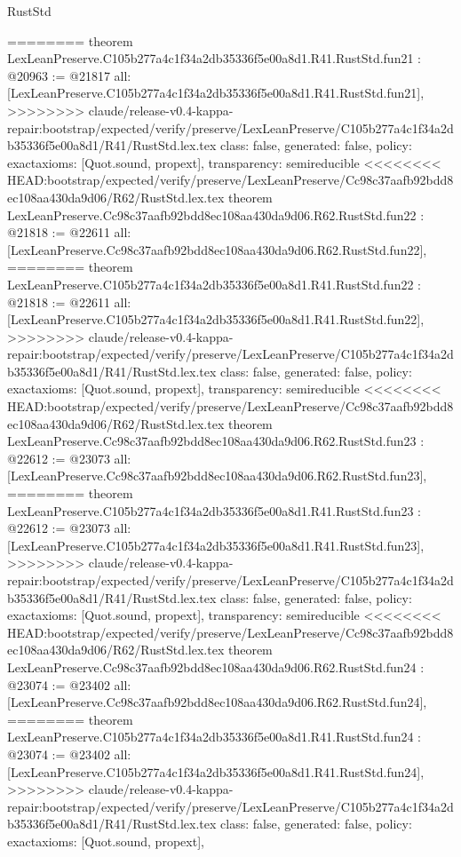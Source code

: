 \begin{lexlean}{RustStd}
\begin{coremodule}
{\begin{coremodule}
{{{{{{{{{{{{{{{{{{{{{{{{========
theorem LexLeanPreserve.C105b277a4c1f34a2db35336f5e00a8d1.R41.RustStd.fun21 : @20963 := @21817 {
  all: [LexLeanPreserve.C105b277a4c1f34a2db35336f5e00a8d1.R41.RustStd.fun21],
>>>>>>>> claude/release-v0.4-kappa-repair:bootstrap/expected/verify/preserve/LexLeanPreserve/C105b277a4c1f34a2db35336f5e00a8d1/R41/RustStd.lex.tex
  class: false,
  generated: false,
  policy: exact{axioms: [Quot.sound, propext]},
  transparency: semireducible
}
<<<<<<<< HEAD:bootstrap/expected/verify/preserve/LexLeanPreserve/Cc98c37aafb92bdd8ec108aa430da9d06/R62/RustStd.lex.tex
theorem LexLeanPreserve.Cc98c37aafb92bdd8ec108aa430da9d06.R62.RustStd.fun22 : @21818 := @22611 {
  all: [LexLeanPreserve.Cc98c37aafb92bdd8ec108aa430da9d06.R62.RustStd.fun22],
========
theorem LexLeanPreserve.C105b277a4c1f34a2db35336f5e00a8d1.R41.RustStd.fun22 : @21818 := @22611 {
  all: [LexLeanPreserve.C105b277a4c1f34a2db35336f5e00a8d1.R41.RustStd.fun22],
>>>>>>>> claude/release-v0.4-kappa-repair:bootstrap/expected/verify/preserve/LexLeanPreserve/C105b277a4c1f34a2db35336f5e00a8d1/R41/RustStd.lex.tex
  class: false,
  generated: false,
  policy: exact{axioms: [Quot.sound, propext]},
  transparency: semireducible
}
<<<<<<<< HEAD:bootstrap/expected/verify/preserve/LexLeanPreserve/Cc98c37aafb92bdd8ec108aa430da9d06/R62/RustStd.lex.tex
theorem LexLeanPreserve.Cc98c37aafb92bdd8ec108aa430da9d06.R62.RustStd.fun23 : @22612 := @23073 {
  all: [LexLeanPreserve.Cc98c37aafb92bdd8ec108aa430da9d06.R62.RustStd.fun23],
========
theorem LexLeanPreserve.C105b277a4c1f34a2db35336f5e00a8d1.R41.RustStd.fun23 : @22612 := @23073 {
  all: [LexLeanPreserve.C105b277a4c1f34a2db35336f5e00a8d1.R41.RustStd.fun23],
>>>>>>>> claude/release-v0.4-kappa-repair:bootstrap/expected/verify/preserve/LexLeanPreserve/C105b277a4c1f34a2db35336f5e00a8d1/R41/RustStd.lex.tex
  class: false,
  generated: false,
  policy: exact{axioms: [Quot.sound, propext]},
  transparency: semireducible
}
<<<<<<<< HEAD:bootstrap/expected/verify/preserve/LexLeanPreserve/Cc98c37aafb92bdd8ec108aa430da9d06/R62/RustStd.lex.tex
theorem LexLeanPreserve.Cc98c37aafb92bdd8ec108aa430da9d06.R62.RustStd.fun24 : @23074 := @23402 {
  all: [LexLeanPreserve.Cc98c37aafb92bdd8ec108aa430da9d06.R62.RustStd.fun24],
========
theorem LexLeanPreserve.C105b277a4c1f34a2db35336f5e00a8d1.R41.RustStd.fun24 : @23074 := @23402 {
  all: [LexLeanPreserve.C105b277a4c1f34a2db35336f5e00a8d1.R41.RustStd.fun24],
>>>>>>>> claude/release-v0.4-kappa-repair:bootstrap/expected/verify/preserve/LexLeanPreserve/C105b277a4c1f34a2db35336f5e00a8d1/R41/RustStd.lex.tex
  class: false,
  generated: false,
  policy: exact{axioms: [Quot.sound, propext]},
}}}}}}}}}}}}}}}}}}}}}}}}}}}}
\end{coremodule}}
\end{coremodule}
\end{lexlean}
